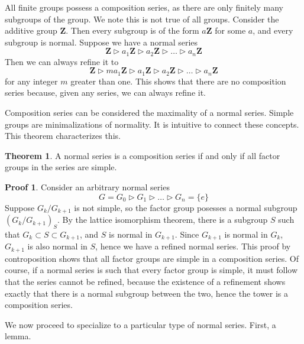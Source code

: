 \documentclass[12pt]{amsbook}
\theoremstyle{definition}
\newtheorem{theorem}{Theorem}[chapter]
\newtheorem*{prf}{Proof}
\newcommand{\bint}{\mathbf{Z}} %
\begin{document}
All finite groups possess a composition series, as there are only finitely many subgroups of the group. We note this is not true of all groups. Consider the additive group $\bint$. Then every subgroup is of the form $a\bint$ for some $a$, and every subgroup is normal. Suppose we have a normal series
%
\[ \bint \rhd a_1\bint \rhd a_2\bint \rhd \dots \rhd a_n\bint \]
%
Then we can always refine it to
%
\[ \bint \rhd ma_1\bint \rhd a_1\bint \rhd a_2\bint \rhd \dots \rhd a_n\bint \]
%
for any integer $m$ greater than one. This shows that there are no composition series because, given any series, we can always refine it.

Composition series can be considered the maximality of a normal series. Simple groups are minimalizations of normality. It is intuitive to connect these concepts. This theorem characterizes this.

\begin{theorem}
    A normal series is a composition series if and only if all factor groups in the series are simple.
\end{theorem}
\begin{prf}
    Consider an arbitrary normal series
    \[ G = G_0 \rhd G_1 \rhd \dots \rhd G_n = \{ e \} \]
    Suppose $G_k/G_{k+1}$ is not simple, so the factor group posesses a normal subgroup $(G_k/G_{k+1})_S$. By the lattice isomorphism theorem, there is a subgroup $S$ such that $G_k \subset S \subset G_{k+1}$, and $S$ is normal in $G_{k+1}$. Since $G_{k+1}$ is normal in $G_k$, $G_{k+1}$ is also normal in $S$, hence we have a refined normal series. This proof by controposition shows that all factor groups are simple in a composition series. Of course, if a normal series is such that every factor group is simple, it must follow that the series cannot be refined, because the existence of a refinement shows exactly that there is a normal subgroup between the two, hence the tower is a composition series.
\end{prf}

We now proceed to specialize to a particular type of normal series. First, a lemma.
\end{document}
